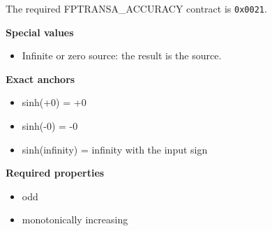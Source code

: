 The required FPTRANSA\_ACCURACY contract is \texttt{0x0021}.

\textbf{Special values}\par
\begin{itemize}
\item Infinite or zero source: the result is the source.
\end{itemize}

\textbf{Exact anchors}\par
\begin{itemize}
\item sinh(+0) = +0
\item sinh(-0) = -0
\item sinh(infinity) = infinity with the input sign
\end{itemize}

\textbf{Required properties}\par
\begin{itemize}
\item odd
\item monotonically increasing
\end{itemize}
